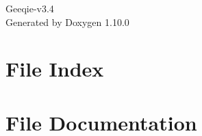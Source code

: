 \documentclass[twoside]{book}
\newcommand{\+}{\discretionary{\mbox{\scriptsize$\hookleftarrow$}}{}{}}
\newcommand{\clearemptydoublepage}{%
    \newpage{\pagestyle{empty}\cleardoublepage}%
  }
\begin{document}
  \raggedbottom
  \begin{titlepage}
  \vspace*{7cm}
  \begin{center}%
  {\Large Geeqie-\/v3.\+4}\\
  \vspace*{1cm}
  {\large Generated by Doxygen 1.10.0}\\
  \end{center}
  \end{titlepage}
  \clearemptydoublepage
  \tableofcontents
  \clearemptydoublepage
\chapter{File Index}

\chapter{File Documentation}


  \backmatter
  \newpage
  \clearemptydoublepage
  \printindex
\end{document}
